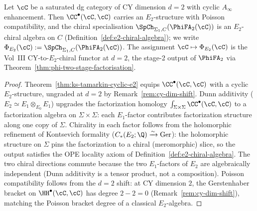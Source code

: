 \begin{corollary}
\label{cor:e2-chiral-from-cy2}
Let $\cC$ be a saturated dg category of CY dimension $d=2$ with
cyclic $A_\infty$ enhancement. Then $\CC^\bullet(\cC,\cC)$ carries an
$E_2$-structure with Poisson compatibility, and the chiral specialisation
$\SpCh_{\Sigma_1, C}(\PhiFA_2(\cC))$
is an $E_2$-chiral algebra on $C$
(Definition~\ref{def:e2-chiral-algebra}); we write
$\Phi_{E_2}(\cC) := \SpCh_{\Sigma_1, C}(\PhiFA_2(\cC))$.
The assignment $\cC \mapsto \Phi_{E_2}(\cC)$ is the Vol~III CY-to-$E_2$-chiral
functor at $d=2$, the stage-2 output of $\PhiFA_2$ via
Theorem~\ref{thm:phi-two-stage-factorisation}.
\end{corollary}

\begin{proof}
Theorem~\ref{thm:ks-tamarkin-cyclic-e2} equips $\CC^\bullet(\cC,\cC)$
with a cyclic $E_2$-structure, ungraded at $d=2$ by
Remark~\ref{rem:cy-dim-shift}. Dunn additivity
($E_2 \simeq E_1 \otimes_{E_0} E_1$) upgrades the factorization
homology $\int_{\Sigma \times \Sigma} \CC^\bullet(\cC,\cC)$ to a
factorization algebra on $\Sigma \times \Sigma$: each $E_1$-factor
contributes factorization structure along one copy of $\Sigma$.
Chirality in each factor follows from the holomorphic refinement of
Kontsevich formality ($C_*(E_2; \Q) \xrightarrow{\sim} \mathrm{Ger}$):
the holomorphic structure on $\Sigma$ pins the factorization to a
chiral (meromorphic) slice, so the output satisfies the OPE locality
axiom of Definition~\ref{def:e2-chiral-algebra}. The two chiral
directions commute because the two $E_1$-factors of $E_2$ are
algebraically independent (Dunn additivity is a tensor product, not
a composition). Poisson compatibility follows from the $d = 2$
shift: at CY dimension $2$, the Gerstenhaber bracket on
$\HH^\bullet(\cC, \cC)$ has degree $2 - 2 = 0$
(Remark~\ref{rem:cy-dim-shift}), matching the Poisson bracket
degree of a classical $E_2$-algebra.
\end{proof}

